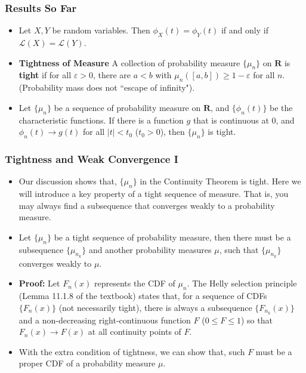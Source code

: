 \documentclass[handout]{beamer}
\begin{document}
\frame
{
  \frametitle{Results So Far} 

 \begin{itemize}
   \item<1->[] \begin{Theorem} Let $X, Y$ be random variables. Then $\phi_X(t)=\phi_Y(t)$ if and only if $\mathcal{L}(X)=\mathcal{L} (Y)$.   
   \end{Theorem}
   
 \item<2-> \textbf{Tightness of Measure} A collection of probability measure $\{\mu_n\}$ on $\mathbf{R}$ is \textbf{tight} if for all $\varepsilon>0$, there are $a<b$ with $\mu_n([a,b]) \geq 1-\varepsilon$ for all $n$. (Probability mass does not ``escape of infinity").
    
    
 
 \item<3->[] \begin{Lemma} 
 Let $\{\mu_n\}$ be a sequence of probability measure on $\mathbf{R}$, and $\{\phi_n(t)\}$ be the characteristic functions. If there is a function $g$ that is continuous at 0, and $\phi_n(t)\rightarrow g(t)$ for all $|t|<t_0$ ($t_0>0$), then $\{\mu_n\}$ is tight. 
 \end{Lemma}

   
 \end{itemize}
}


 
 \frame
{
  \frametitle{Tightness and Weak Convergence I}

 \begin{itemize}
 
 \item<1-> Our discussion shows that, $\{\mu_n\}$ in the Continuity Theorem is tight. Here we will introduce a key property of a tight sequence of measure. That is, you may always find a subsequence that converges weakly to a probability measure. 
 
  \item<2->[] \begin{Theorem}[11.1.10] 
 Let $\{\mu_n\}$ be a tight sequence of probability measure, then there must be a subsequence $\{\mu_{n_k}\}$ and another probability measures $\mu$, such that $\{\mu_{n_k}\}$ converges weakly to $\mu$.
 \end{Theorem}
 
\item<3-> \textbf{Proof:} Let $F_n(x)$ represents the CDF of $\mu_n$. The Helly selection principle (Lemma 11.1.8 of the textbook) states that, for a sequence of CDFs $\{F_n(x)\}$ (not necessarily tight), there is always a subsequence $\{F_{n_k} (x)\}$ and a non-decreasing right-continuous function $F$ ($0\leq F\leq1$) so that $F_n(x)\rightarrow F(x)$ at all continuity points of $F$.  
\item<4->[-] With the extra condition of tightness, we can show that, such $F$ must be a proper CDF of a probability measure $\mu$. 
 
\end{itemize}
 }
 
\end{document}
